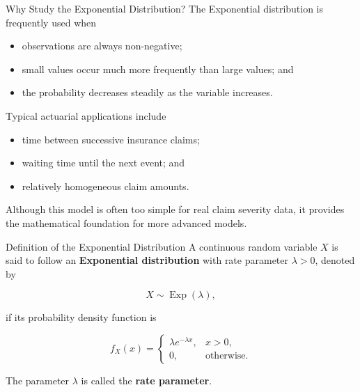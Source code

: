 \documentclass[
  ignorenonframetext,
  aspectratio=169,
]{beamer}
\providecommand{\tightlist}{%
  \setlength{\itemsep}{0pt}\setlength{\parskip}{0pt}}
\begin{document}
\begin{frame}{Why Study the Exponential Distribution?}
\protect{}\label{why-study-the-exponential-distribution}
The Exponential distribution is frequently used when

\begin{itemize}
\tightlist
\item
  observations are always non-negative;
\item
  small values occur much more frequently than large values; and
\item
  the probability decreases steadily as the variable increases.
\end{itemize}

Typical actuarial applications include

\begin{itemize}
\tightlist
\item
  time between successive insurance claims;
\item
  waiting time until the next event; and
\item
  relatively homogeneous claim amounts.
\end{itemize}

Although this model is often too simple for real claim severity data, it
provides the mathematical foundation for more advanced models.
\end{frame}

\begin{frame}{Definition of the Exponential Distribution}
\protect{}\label{definition-of-the-exponential-distribution}
A continuous random variable \(X\) is said to follow an
\textbf{Exponential distribution} with rate parameter \(\lambda>0\),
denoted by

\[
X\sim\operatorname{Exp}(\lambda),
\]

if its probability density function is

\[
f_X(x)=
\begin{cases}
\lambda e^{-\lambda x}, & x>0,\\
0, & \text{otherwise}.
\end{cases}
\]

The parameter \(\lambda\) is called the \textbf{rate parameter}.
\end{frame}
\end{document}
